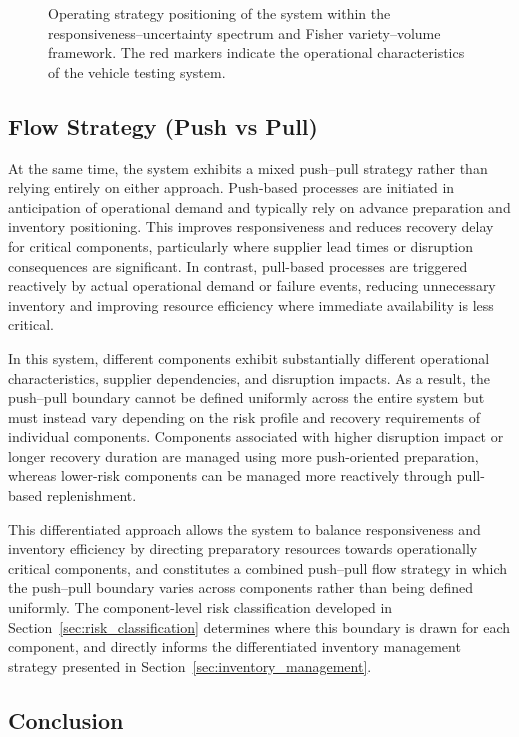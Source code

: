 \documentclass[11pt, a4paper]{report}
\numberwithin{equation}{section}
\begin{document}
\begin{refsection}
\begin{figure}[h]
    \caption{Operating strategy positioning of the system within the responsiveness--uncertainty spectrum and Fisher variety--volume framework. The red markers indicate the operational characteristics of the vehicle testing system.}

    \label{fig:lean_vs_agile}
\end{figure}

\subsection{Flow Strategy (Push vs Pull)}

At the same time, the system exhibits a mixed push--pull strategy rather than relying entirely on either approach. Push-based processes are initiated in anticipation of operational demand and typically rely on advance preparation and inventory positioning. This improves responsiveness and reduces recovery delay for critical components, particularly where supplier lead times or disruption consequences are significant. In contrast, pull-based processes are triggered reactively by actual operational demand or failure events, reducing unnecessary inventory and improving resource efficiency where immediate availability is less critical.

In this system, different components exhibit substantially different operational characteristics, supplier dependencies, and disruption impacts. As a result, the push--pull boundary cannot be defined uniformly across the entire system but must instead vary depending on the risk profile and recovery requirements of individual components. Components associated with higher disruption impact or longer recovery duration are managed using more push-oriented preparation, whereas lower-risk components can be managed more reactively through pull-based replenishment.

This differentiated approach allows the system to balance responsiveness and inventory efficiency by directing preparatory resources towards operationally critical components, and constitutes a combined push–pull flow strategy in which the push–pull boundary varies across components rather than being defined uniformly. The component-level risk classification developed in Section~\ref{sec:risk_classification} determines where this boundary is drawn for each component, and directly informs the differentiated inventory management strategy presented in Section~\ref{sec:inventory_management}.

\subsection{Conclusion}


\end{refsection}
\end{document}

